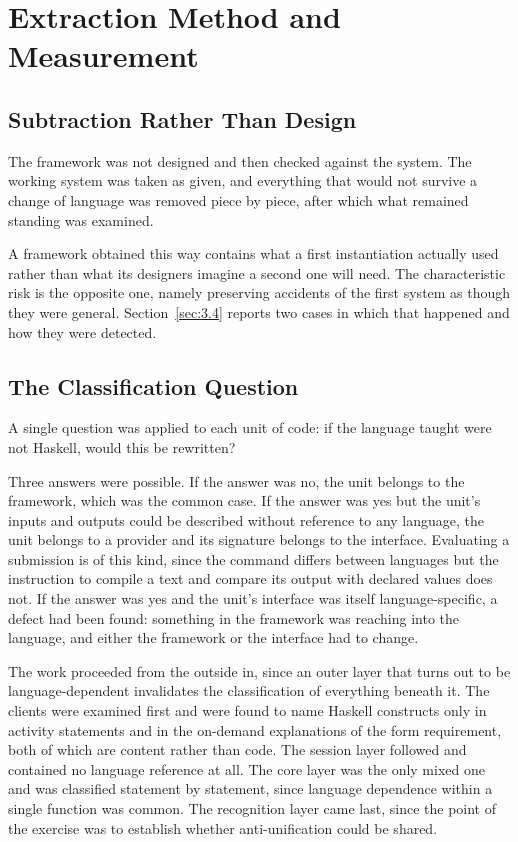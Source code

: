 \documentclass[journal]{IEEEtran}
\begin{document}
\section{Extraction Method and Measurement}\label{sec:3}
\subsection{Subtraction Rather Than Design}\label{sec:3.1}
The framework was not designed and then checked against the system. The
working system was taken as given, and everything that would not survive
a change of language was removed piece by piece, after which what
remained standing was examined.

A framework obtained this way contains what a first instantiation
actually used rather than what its designers imagine a second one will
need. The characteristic risk is the opposite one, namely preserving
accidents of the first system as though they were general. Section~\ref{sec:3.4}
reports two cases in which that happened and how they were detected.

\subsection{The Classification Question}\label{sec:3.2}
A single question was applied to each unit of code: if the language
taught were not Haskell, would this be rewritten?

Three answers were possible. If the answer was no, the unit belongs to
the framework, which was the common case. If the answer was yes but the
unit's inputs and outputs could be described without reference to any
language, the unit belongs to a provider and its signature belongs to
the interface. Evaluating a submission is of this kind, since the
command differs between languages but the instruction to compile a text
and compare its output with declared values does not. If the answer was
yes and the unit's interface was itself language-specific, a defect had
been found: something in the framework was reaching into the language,
and either the framework or the interface had to change.

The work proceeded from the outside in, since an outer layer that turns
out to be language-dependent invalidates the classification of
everything beneath it. The clients were examined first and were found to
name Haskell constructs only in activity statements and in the on-demand
explanations of the form requirement, both of which are content rather
than code. The session layer followed and contained no language
reference at all. The core layer was the only mixed one and was
classified statement by statement, since language dependence within a
single function was common. The recognition layer came last, since the
point of the exercise was to establish whether anti-unification could be
shared.
\end{document}
